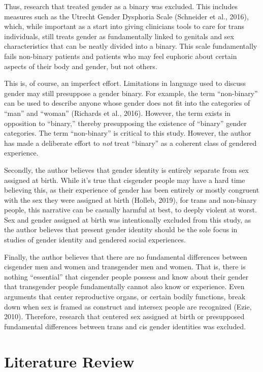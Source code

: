 \documentclass[12pt,twoside]{reedthesis}
\begin{document}
Thus, research that treated gender as a binary was excluded. This includes measures such as the Utrecht Gender Dysphoria Scale (Schneider et al., 2016), which, while important as a start into giving clinicians tools to care for trans individuals, still treats gender as fundamentally linked to genitals and sex characteristics that can be neatly divided into a binary. This scale fundamentally fails non-binary patients and patients who may feel euphoric about certain aspects of their body and gender, but not others.

This is, of course, an imperfect effort. Limitations in language used to discuss gender may still presuppose a gender binary. For example, the term ``non-binary'' can be used to describe anyone whose gender does not fit into the categories of ``man'' and ``woman'' (Richards et al., 2016). However, the term exists in opposition to ``binary,'' thereby presupposing the existence of ``binary'' gender categories. The term ``non-binary'' is critical to this study. However, the author has made a deliberate effort to \emph{not} treat ``binary'' as a coherent class of gendered experience.

Secondly, the author believes that gender identity is entirely separate from sex assigned at birth. While it's true that cisgender people may have a hard time believing this, as their experience of gender has been entirely or mostly congruent with the sex they were assigned at birth (Holleb, 2019), for trans and non-binary people, this narrative can be casually harmful at best, to deeply violent at worst. Sex and gender assigned at birth was intentionally excluded from this study, as the author believes that present gender identity should be the sole focus in studies of gender identity and gendered social experiences.

Finally, the author believes that there are no fundamental differences between cisgender men and women and transgender men and women. That is, there is nothing ``essential'' that cisgender people possess and know about their gender that transgender people fundamentally cannot also know or experience. Even arguments that center reproductive organs, or certain bodily functions, break down when sex is framed as construct and intersex people are recognized (Ezie, 2010). Therefore, research that centered sex assigned at birth or presupposed fundamental differences between trans and cis gender identities was excluded.

\hypertarget{literature-review}{%
\chapter{Literature Review}\label{literature-review}}
\end{document}
